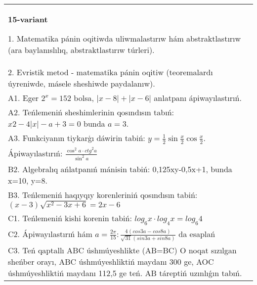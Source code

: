 \documentclass{article}
\begin{document}
\begin{tabular}{m{17cm}}
\textbf{15-variant}

1. Matematika pánin oqitiwda uliwmalastırıw hám abstraktlastırıw (ara baylanıslılıq, abstraktlastırıw túrleri). \\
2. Evristik metod - matematika pánin oqitiw (teoremalardı úyreniwde, másele sheshiwde paydalanıw). \\
A1. Eger \(2^{x} = 152\) bolsa, \(|x - 8| + |x - 6|\) anlatpanı ápiwayılastırıń. \\
A2. Teńlemeniń sheshimlerinin qosındısın tabıń: \(x2 - 4|x| - a + 3 = 0\) bunda \(a = 3\). \\
A3. Funkciyanın tiykarģı dáwirin tabiń: \(y = \frac{1}{2}\sin{\frac{x}{2}\cos\frac{x}{2}}\). \\
Ápiwayılastırıń: \(\frac{\cos^{2}a \cdot {ctg}^{2}a}{\sin^{2}a}\) \\
B2. Algebralıq ańlatpanıń mánisin tabiń: 0,125xy-0,5x+1, bunda x=10, y=8. \\
B3. Teńlemeniń haqıyqıy korenleriniń qosındısın tabiń: \((x-3) \sqrt{x^{2} - 3x + 6} = 2x - 6\) \\
C1. Teńlemeniń kishi korenin tabiń: \(log_{6}x \cdot log_{4}x = log_{6}4\) \\
C2. Ápiwayılastırıń hám \(a = \frac{2\pi}{15}:\frac{4 (cos3a - cos8a) }{\sqrt{31} (sin3a + sin8a) }\) da esaplań \\
C3. Teń qaptallı ABC úshmúyeshlikte (AB=BC) O noqat sızılgan sheńber orayı, ABC úshmúyeshliktiń maydanı 300 ge, AOC úshmúyeshliktiń maydanı 112,5 ge teń. AB táreptiń uzınlıǵın tabıń. \\

\end{tabular}
\vspace{1cm}
\end{document}
